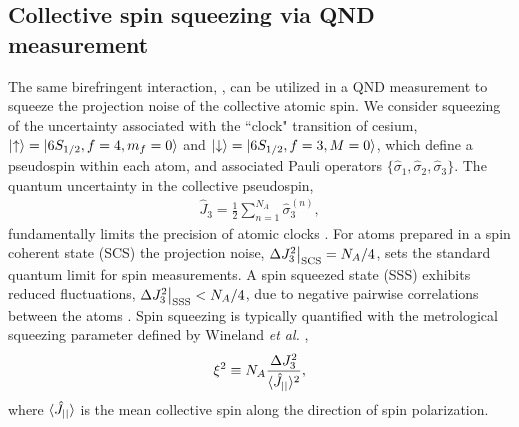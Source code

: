 \documentclass[preprint, aps,pra,onecolumn]{revtex4-1} %
\newcommand{\scs}{{\rm SCS}}
\newcommand{\varz}{\Delta J_3^2}
\newcommand{\jz}{\hat{J}_3}
\begin{document}
	\subsection{Collective spin squeezing via QND measurement}

The same birefringent interaction, , can be utilized in a QND measurement to squeeze the projection noise of the collective atomic spin.  We consider squeezing of the uncertainty associated with the ``clock" transition of cesium, $\lvert{\uparrow}\rangle = \lvert{6S_{1/2}, f=4, m_f=0}\rangle$ and $\lvert{\downarrow}\rangle = \lvert{6S_{1/2}, f=3, M=0}\rangle$, which define a pseudospin within each atom, and associated Pauli operators $\{\hat{\sigma}_1, \hat{\sigma}_2, \hat{\sigma}_3\}$.  The quantum uncertainty in the collective pseudospin,
	\begin{align}
		\jz = \frac{1}{2} \sum_{n=1}^{N_A} \hat{\sigma}_3^{(n)},  
	\end{align}
fundamentally limits the precision of atomic clocks \cite{wineland_spin_1992}. For atoms prepared in a spin coherent state (SCS) the projection noise, $\varz \big|_{\scs} = N_A/4$, sets the standard quantum limit for spin measurements. A spin squeezed state (SSS) exhibits reduced fluctuations, $ \varz \big|_{\rm SSS}  < N_A/4$, due to negative pairwise correlations between the atoms \cite{kitagawa_squeezed_1993}. Spin squeezing is typically quantified with the metrological squeezing parameter defined by Wineland \emph{et al.} \cite{wineland_spin_1992},
	\begin{align} \label{Eq::SqueezingParameter}
		\xi^2 \equiv N_A \frac{ \varz }{ \expt{\hat{J}_{||}}^2 },
	\end{align}
where $\langle{\hat{J}_{||}}\rangle$ is the mean collective spin along the direction of spin polarization. 
\end{document}
